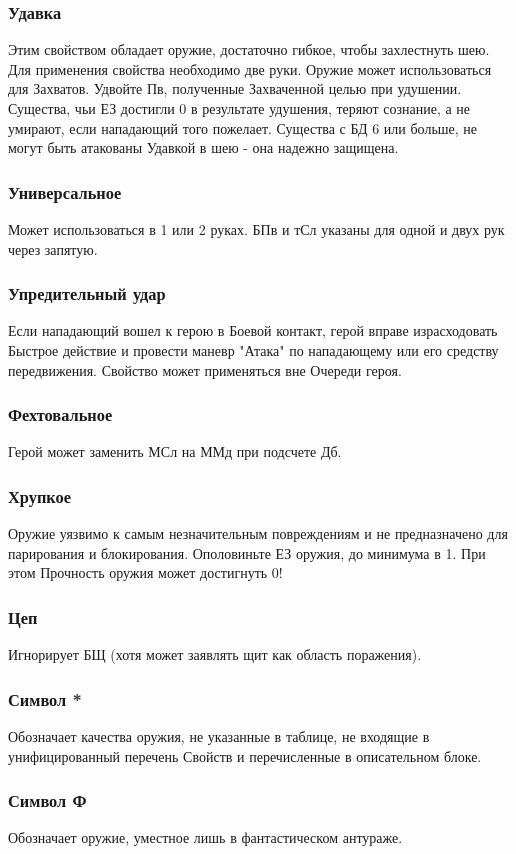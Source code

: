 \subsubsection{Удавка} Этим свойством обладает оружие, достаточно гибкое, чтобы захлестнуть шею.
\newline Для применения свойства необходимо две руки. Оружие может использоваться для Захватов. Удвойте Пв, полученные Захваченной целью при удушении. Существа, чьи ЕЗ достигли 0 в результате удушения, теряют сознание, а не умирают, если нападающий того пожелает.
\newline Существа с БД 6 или больше, не могут быть атакованы Удавкой в шею - она надежно защищена.
\subsubsection{Универсальное} Может использоваться в 1 или 2 руках. БПв и тСл указаны для одной и двух рук через запятую.
\subsubsection{Упредительный удар} Если нападающий вошел к герою в Боевой контакт, герой вправе израсходовать Быстрое действие и провести маневр "Атака" по нападающему или его средству передвижения. Свойство может применяться вне Очереди героя.
\subsubsection{Фехтовальное} Герой может заменить МСл на ММд при подсчете Дб.
\subsubsection{Хрупкое} Оружие уязвимо к самым незначительным повреждениям и не предназначено для парирования и блокирования. Ополовиньте ЕЗ оружия, до минимума в 1. При этом Прочность оружия может достигнуть 0!
\subsubsection{Цеп} Игнорирует БЩ (хотя может заявлять щит как область поражения). 
\subsubsection{Символ *} Обозначает качества оружия, не указанные в таблице, не входящие в унифицированный перечень Свойств и перечисленные в описательном блоке.
\subsubsection{Символ Ф} Обозначает оружие, уместное лишь в фантастическом антураже.

